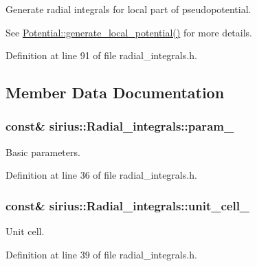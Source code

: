Generate radial integrals for local part of pseudopotential. 

See \hyperlink{classsirius_1_1_potential_ab4383d38a605d0b6367da339035e0130}{Potential\+::generate\+\_\+local\+\_\+potential()} for more details. 

Definition at line 91 of file radial\+\_\+integrals.\+h.



\subsection{Member Data Documentation}
\hypertarget{classsirius_1_1_radial__integrals_a88e8521b4204f08956b481ef8d4687c3}{}
\subsubsection[{param\+\_\+}]{ const\& sirius\+::\+Radial\+\_\+integrals\+::param\+\_\+\hspace{0.3cm}{\ttfamily [private]}}\label{classsirius_1_1_radial__integrals_a88e8521b4204f08956b481ef8d4687c3}


Basic parameters. 



Definition at line 36 of file radial\+\_\+integrals.\+h.

\hypertarget{classsirius_1_1_radial__integrals_ae644346b2e6a36a6c281ad577efcc5d8}{}
\subsubsection[{unit\+\_\+cell\+\_\+}]{ const\& sirius\+::\+Radial\+\_\+integrals\+::unit\+\_\+cell\+\_\+\hspace{0.3cm}{\ttfamily [private]}}\label{classsirius_1_1_radial__integrals_ae644346b2e6a36a6c281ad577efcc5d8}


Unit cell. 



Definition at line 39 of file radial\+\_\+integrals.\+h.

